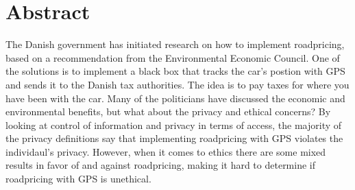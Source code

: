 \section*{Abstract}
The Danish government has initiated research on how to implement roadpricing, based on a recommendation from the Environmental Economic Council. One of the solutions is to implement a black box that tracks the car's postion with GPS and sends it to the Danish tax authorities. The idea is to pay taxes for where you have been with the car. Many of the politicians have discussed the economic and environmental benefits, but what about the privacy and ethical concerns? By looking at control of information and privacy in terms of access, the majority of the privacy definitions say that implementing roadpricing with GPS violates the individaul's privacy. However, when it comes to ethics there are some mixed results in favor of and against roadpricing, making it hard to determine if roadpricing with GPS is unethical.